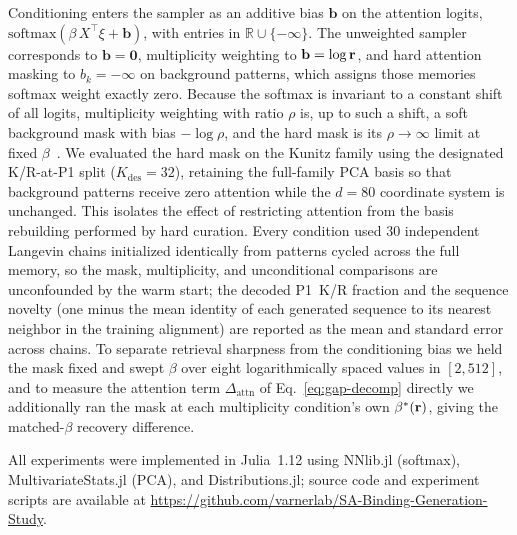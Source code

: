 Conditioning enters the sampler as an additive bias $\mathbf{b}$ on the attention logits,
$\mathrm{softmax}(\beta\,X^{\top}\xi + \mathbf{b})$, with entries in $\mathbb{R} \cup \{-\infty\}$.
The unweighted sampler corresponds to $\mathbf{b} = \mathbf{0}$, multiplicity weighting to
$\mathbf{b} = \log\mathbf{r}$, and hard attention masking to $b_k = -\infty$ on background patterns,
which assigns those memories softmax weight exactly zero. Because the softmax is invariant to a
constant shift of all logits, multiplicity weighting with ratio $\rho$ is, up to such a shift, a
soft background mask with bias $-\log\rho$, and the hard mask is its $\rho \to \infty$ limit at
fixed $\beta$~\cite{varnerSAProtein2026}. We evaluated the hard mask on the Kunitz family using
the designated K/R-at-P1 split ($K_{\mathrm{des}} = 32$), retaining the full-family PCA basis so
that background patterns receive zero attention while the $d = 80$ coordinate system is unchanged.
This isolates the effect of restricting attention from the basis rebuilding performed by hard
curation. Every condition used 30 independent Langevin chains initialized identically from patterns
cycled across the full memory, so the mask, multiplicity, and unconditional comparisons are
unconfounded by the warm start; the decoded P1~K/R fraction and the sequence novelty (one minus the
mean identity of each generated sequence to its nearest neighbor in the training alignment) are
reported as the mean and standard error across chains. To separate retrieval sharpness from the
conditioning bias we held the mask fixed and swept $\beta$ over eight logarithmically spaced values
in $[2, 512]$, and to measure the attention term $\Delta_{\mathrm{attn}}$ of Eq.~\ref{eq:gap-decomp}
directly we additionally ran the mask at each multiplicity condition's own $\beta^{*}(\mathbf{r})$, giving
the matched-$\beta$ recovery difference.

All experiments were implemented in Julia~1.12 using NNlib.jl
(softmax), MultivariateStats.jl (PCA), and Distributions.jl; source code and experiment scripts
are available at \url{https://github.com/varnerlab/SA-Binding-Generation-Study}.
